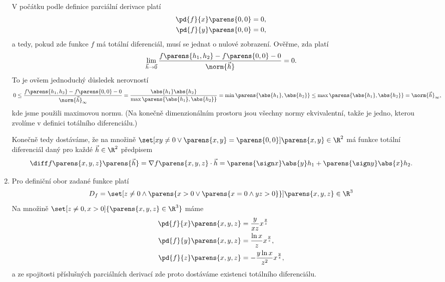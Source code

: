 \documentclass[answers]{exam}
\begin{document}
\begin{questions}
\begin{solution}
\begin{enumerate}[label=(\roman*)]
			V počátku podle definice parciální derivace platí
			\begin{align*}
				\pd{f}{x}\parens{0,0} &= 0,
				\\
				\pd{f}{y}\parens{0,0} &= 0,
			\end{align*}
			a tedy, pokud zde funkce $f$ má totální diferenciál, musí se jednat o nulové zobrazení. Ověřme, zda platí
			\begin{equation*}
				\lim_{\vec{h} \to \vec{0}}
				\frac{f\parens{h_1, h_2} - f\parens{0,0} - 0}{\norm{\vec{h}}}
				=
				0.
			\end{equation*}
			To je ovšem jednoduchý důsledek nerovností
			\begin{equation*}
				0
				\le
				\frac{f\parens{h_1, h_2} - f\parens{0,0} - 0}{{\norm{\vec{h}}}_{\infty}}
				=
				\frac{\abs{h_1} \abs{h_2}}{\max \parens{\abs{h_1}, \abs{h_2}}}
				=
				\min \parens{\abs{h_1}, \abs{h_2}}
				\le
				\max \parens{\abs{h_1}, \abs{h_2}}
				=
				{\norm{\vec{h}}}_{\infty},
			\end{equation*}
			kde jsme použili maximovou normu. (Na konečně dimenzionálním prostoru jsou všechny normy ekvivalentní, takže je jedno, kterou zvolíme v definici totálního diferenciálu.)
			
			Konečně tedy dostáváme, že na množině $\set[xy \neq 0 \lor \parens{x, y} = \parens{0, 0}]{\parens{x, y} \in \R^2}$ má funkce totální diferenciál daný pro každé $\vec{h} \in \R^2$ předpisem
			\begin{equation*}
				\diff f \parens{x, y, z} \parens{\vec{h}}
				=
				\nabla f \parens{x,y,z} \cdot \vec{h}
				=
				\parens{\sign x} \abs{y} h_1
				+
				\parens{\sign y} \abs{x} h_2.			
			\end{equation*}
			
		\item 
		
			Pro definiční obor zadané funkce platí
			\begin{equation*}
				D_f
				=
				\set[z \neq 0 \land \parens{x > 0 \lor \parens{x = 0 \land yz > 0}}]{\parens{x, y, z} \in \R^3}
			\end{equation*}
			Na množině $\set[z \neq 0, x > 0]{\parens{x, y, z} \in \R^3}$ máme
			\begin{align*}
				\pd{f}{x}\parens{x,y,z} &= \frac{y}{xz} x^{\frac{y}{z}}
				\\
				\pd{f}{y}\parens{x,y,z} &= \frac{\ln x}{z} x^{\frac{y}{z}},
				\\
				\pd{f}{z}\parens{x,y,z} &= - \frac{y \ln x}{z^2} x^{\frac{y}{z}},
			\end{align*}
			a ze spojitosti příslušných parciálních derivací zde proto dostáváme existenci totálního diferenciálu.
			

\end{enumerate}
\end{solution}
\end{questions}
\end{document}
